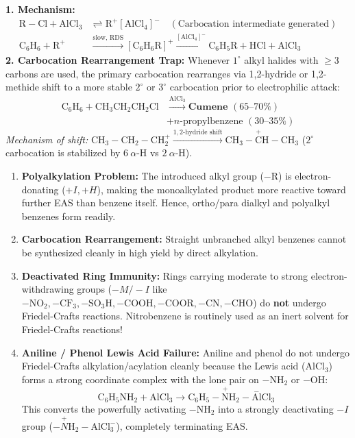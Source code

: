 \documentclass[10pt,twoside,openright]{book}
\begin{document}
\begin{conceptbox}
\textbf{1. Mechanism:}
\begin{align}
  \mathrm{R-Cl} + \mathrm{AlCl_3} &\rightleftharpoons \mathrm{R}^+[\mathrm{AlCl_4}]^- \quad (\text{Carbocation intermediate generated})\\
  \mathrm{C_6H_6} + \mathrm{R}^+ &\xrightarrow{\text{slow, RDS}} [\mathrm{C_6H_6R}]^+ \xrightarrow{[\mathrm{AlCl_4}]^-} \mathrm{C_6H_5R} + \mathrm{HCl} + \mathrm{AlCl_3}
\end{align}
\textbf{2. Carbocation Rearrangement Trap:} Whenever $1^\circ$ alkyl halides with $\ge 3$ carbons are used, the primary carbocation rearranges via 1,2-hydride or 1,2-methide shift to a more stable $2^\circ$ or $3^\circ$ carbocation prior to electrophilic attack:
\begin{align}
  \mathrm{C_6H_6} + \mathrm{CH_3CH_2CH_2Cl} &\xrightarrow{\mathrm{AlCl_3}} \textbf{Cumene } (65\text{--}70\%) \\
  &+ n\text{-propylbenzene } (30\text{--}35\%)
\end{align}
\textit{Mechanism of shift:} $\mathrm{CH_3-CH_2-CH_2^+} \xrightarrow{1,2\text{-hydride shift}} \mathrm{CH_3-\overset{+}{C}H-CH_3}$ ($2^\circ$ carbocation is stabilized by $6\ \alpha$-H vs $2\ \alpha$-H).
\end{conceptbox}

\begin{trapbox}
\begin{enumerate}[leftmargin=*]
  \item \textbf{Polyalkylation Problem:} The introduced alkyl group ($-\mathrm{R}$) is electron-donating ($+I, +H$), making the monoalkylated product more reactive toward further EAS than benzene itself. Hence, ortho/para dialkyl and polyalkyl benzenes form readily.
  \item \textbf{Carbocation Rearrangement:} Straight unbranched alkyl benzenes cannot be synthesized cleanly in high yield by direct alkylation.
  \item \textbf{Deactivated Ring Immunity:} Rings carrying moderate to strong electron-withdrawing groups ($-M / -I$ like $-\mathrm{NO_2, -CF_3, -SO_3H, -COOH, -COOR, -CN, -CHO}$) do \textbf{not} undergo Friedel-Crafts reactions. Nitrobenzene is routinely used as an inert solvent for Friedel-Crafts reactions!
  \item \textbf{Aniline / Phenol Lewis Acid Failure:} Aniline and phenol do not undergo Friedel-Crafts alkylation/acylation cleanly because the Lewis acid ($\mathrm{AlCl_3}$) forms a strong coordinate complex with the lone pair on $-\mathrm{NH_2}$ or $-\mathrm{OH}$:
  \begin{equation}
    \mathrm{C_6H_5NH_2} + \mathrm{AlCl_3} \to \mathrm{C_6H_5-\overset{+}{N}H_2-\overset{-}{Al}Cl_3}
  \end{equation}
  This converts the powerfully activating $-\mathrm{NH_2}$ into a strongly deactivating $-I$ group ($-\overset{+}{N}\mathrm{H_2-AlCl_3^-}$), completely terminating EAS.
\end{enumerate}
\end{trapbox}
\end{document}
